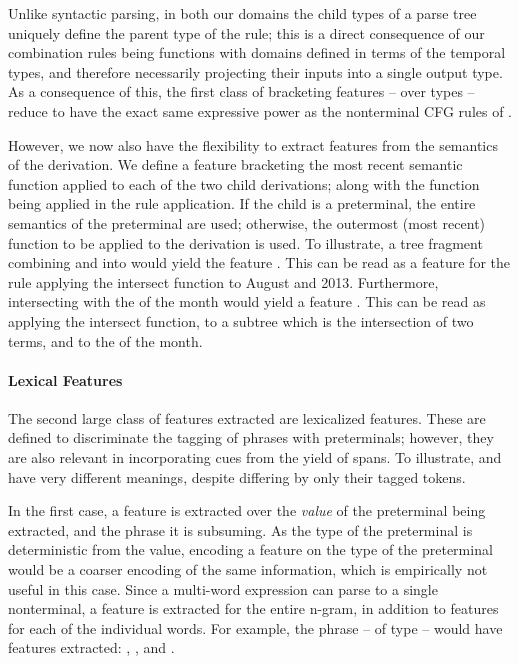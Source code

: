 Unlike syntactic parsing, in both our domains the child types of a parse tree
  uniquely define the parent type of the rule; this is a direct consequence
  of our combination rules being functions with domains defined in terms of the
  temporal types, and therefore necessarily projecting
  their inputs into a single output type.
As a consequence of this, the first class of bracketing features -- over
  types -- reduce to have the exact same
  expressive power as the nonterminal CFG rules of \me.

However, we now also have the flexibility to extract features from the
  semantics of the derivation.
We define a feature bracketing the most recent semantic function
  applied to each of the two child derivations; along with the function being
  applied in the rule application.
If the child is a preterminal, the entire semantics of the preterminal are used;
  otherwise, the outermost (most recent) function to be applied to the
  derivation is used.
To illustrate, a tree fragment combining  and  into
   would yield the feature .
This can be read as a feature for the rule applying the intersect function
  to August and 2013.
Furthermore, intersecting  with the  of the month would
  yield a feature .
This can be read as applying the intersect function, to a subtree which is
  the intersection of two terms, and to the  of the month.


\paragraph{Lexical Features}
The second large class of features extracted are lexicalized features.
These are defined to discriminate the tagging of phrases with preterminals;
  however, they are also relevant in incorporating cues from the yield
  of  spans.
To illustrate,  and  have very different meanings,
  despite differing by only their  tagged tokens.

In the first case, a feature is extracted over the \textit{value} of the
  preterminal being extracted, and the phrase it is subsuming.
As the type of the preterminal is deterministic from the value, encoding
  a feature on the type of the preterminal would be a coarser encoding of
  the same information, which is empirically not useful in this case.
Since a multi-word expression can parse to a single nonterminal, a feature
  is extracted for the entire n-gram, in addition to features for each of the
  individual words.
For example, the phrase  -- of type  -- would have
  features extracted:
  ,
  , and
  .

